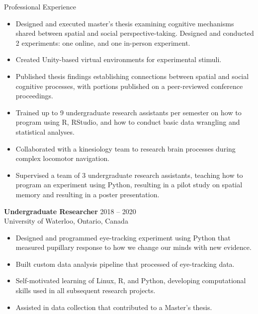 \documentclass{resume} %
\begin{document}
\begin{rSection}{Professional Experience}
        \begin{itemize}[nosep, leftmargin=*, widest=0]
            \item Designed and executed 
            master's thesis examining cognitive 
            mechanisms shared between spatial and social perspective-taking. 
            Designed and conducted 2 experiments: one online, and 
            one 
            in-person experiment.
            \item Created Unity-based virtual environments for experimental 
            stimuli.
            \item Published thesis findings establishing connections 
            between spatial and social cognitive processes, with portions 
            published on a peer-reviewed conference proceedings.
            \item Trained up to 9 undergraduate research assistants per 
            semester on how to program using R, RStudio, and how to conduct 
            basic data wrangling and statistical analyses.
            \item Collaborated with a kinesiology team to research brain 
            processes during complex locomotor navigation.
            \item Supervised a team of 3 undergraduate research 
            assistants, teaching how to program an experiment using Python, 
            resulting in a pilot study on spatial memory and resulting in a 
            poster presentation.
        \end{itemize}
        
        {\textbf{Undergraduate Researcher} \hfill {2018 -- 2020}
            \\ {University of Waterloo, Ontario, Canada}}
        
        \begin{itemize}[nosep, leftmargin=*, widest=0]
            \item Designed and programmed eye-tracking experiment using 
            Python that measured pupillary response to how we change 
            our minds with new evidence.
            \item Built custom data analysis pipeline that processed 
            of eye-tracking data.
            \item Self-motivated learning of Linux, R, and Python, developing 
            computational skills used in all subsequent research projects.
            \item Assisted in data collection that contributed to a Master's 
            thesis.
        \end{itemize}
        
    \end{rSection}
    \pagebreak
    
\end{document}
